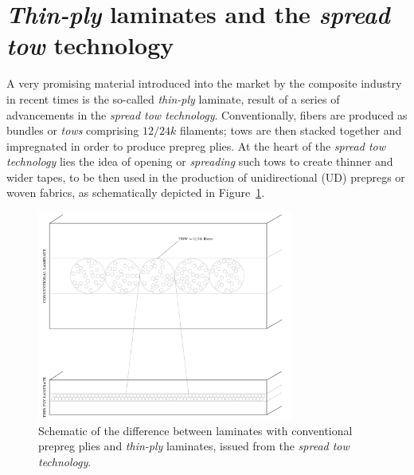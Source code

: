 \section{\textit{Thin-ply} laminates and the \textit{spread tow} technology}

A very promising material introduced into the market by the composite industry in recent times is the so-called \emph{thin-ply} laminate, result of a series of advancements in the \textit{spread tow technology}. Conventionally, fibers are produced as bundles or \textit{tows} comprising $12/24k$ filaments; tows are then stacked together and impregnated in order to produce prepreg plies. At the heart of the \textit{spread tow technology} lies the idea of opening or \textit{spreading} such tows to create thinner and wider tapes, to be then used in the production of unidirectional (UD) prepregs or woven fabrics, as schematically depicted in Figure~\ref{chap1:fig:spreadtowtech}.

\begin{figure}[!h]
\includegraphics[width=0.75\textwidth]{pics/spread-tow-tech.pdf}
\caption{Schematic of the difference between laminates with conventional prepreg plies and \emph{thin-ply} laminates, issued from the \textit{spread tow technology}.}\label{chap1:fig:spreadtowtech}
\end{figure}

